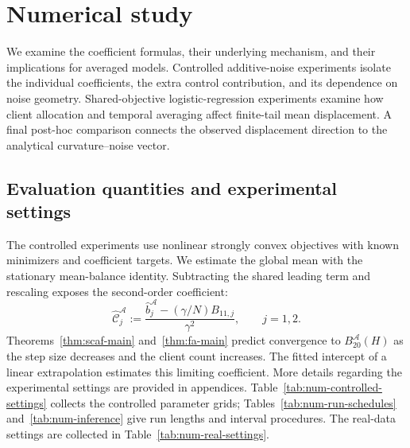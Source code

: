 \section{Numerical study}
\label{sec:numerics}

\setcounter{topnumber}{3}
\setcounter{bottomnumber}{2}
\setcounter{totalnumber}{4}
\renewcommand{\topfraction}{0.90}
\renewcommand{\bottomfraction}{0.80}
\renewcommand{\textfraction}{0.08}
\renewcommand{\floatpagefraction}{0.75}

We examine the coefficient formulas, their underlying mechanism, and their
implications for averaged models. Controlled additive-noise experiments
isolate the individual coefficients, the extra control contribution, and
its dependence on noise geometry. Shared-objective logistic-regression
experiments examine how client allocation and temporal averaging affect
finite-tail mean displacement. A final post-hoc comparison connects the
observed displacement direction to the analytical curvature--noise vector.

\subsection{Evaluation quantities and experimental settings}
\label{sec:num-protocol}

The controlled experiments use nonlinear strongly convex objectives with
known minimizers and coefficient targets. We estimate the global mean with
the stationary mean-balance identity. Subtracting the shared leading term
and rescaling exposes the second-order coefficient:
\begin{equation}
\label{eq:num-C}
\widehat{\mathcal C}^{\mathcal A}_j
:=\frac{\widehat b^{\mathcal A}_j-(\gamma/N)B_{11,j}}{\gamma^2},
\qquad j=1,2.
\end{equation}
Theorems~\ref{thm:scaf-main} and~\ref{thm:fa-main} predict convergence
to $B_{20}^{\mathcal A}(H)$ as the step size decreases and the client
count increases. The fitted intercept of a linear extrapolation estimates
this limiting coefficient. More details regarding the experimental settings are provided in appendices. Table~\ref{tab:num-controlled-settings}
collects the controlled parameter grids; Tables~\ref{tab:num-run-schedules}
and~\ref{tab:num-inference} give run lengths and interval procedures.
The real-data settings are collected in Table~\ref{tab:num-real-settings}.


